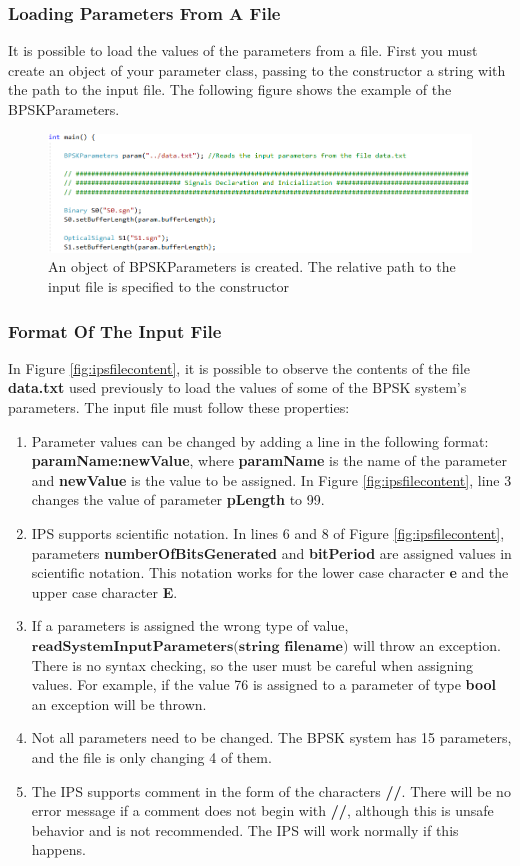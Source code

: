 \subsubsection{Loading Parameters From A File}
It is possible to load the values of the parameters from a file. First you must create an object of your parameter class, passing to the
constructor a string with the path to the input file. The following figure shows the example of the BPSKParameters.
\renewcommand{\figurename}{Figure}
\begin{figure}[H]
\centering
\includegraphics[width=0.8\linewidth]{./chapter/simulator_structure/figures/ips_reading_file}
\caption{An object of BPSKParameters is created. The relative path to the input file is specified to the constructor}
\label{fig:ipsfileparameters}
\end{figure}

\subsubsection{Format Of The Input File}
In Figure \ref{fig:ipsfilecontent}, it is possible to observe the contents of the file \textbf{data.txt} used previously to load the values
of some of the BPSK system's parameters. The input file must follow these properties:
\begin{enumerate}
\item Parameter values can be changed by adding a line in the following format: \textbf{paramName:newValue}, where \textbf{paramName} is the name of the parameter and \textbf{newValue} is the value to be assigned. In Figure \ref{fig:ipsfilecontent}, line 3 changes the value of parameter \textbf{pLength} to 99.
\item IPS supports scientific notation. In lines 6 and 8 of Figure \ref{fig:ipsfilecontent}, parameters \textbf{numberOfBitsGenerated} and \textbf{bitPeriod} are assigned values in scientific notation. This notation works for the lower case character \textbf{e} and the upper case character \textbf{E}.
\item If a parameters is assigned the wrong type of value, $\textbf{readSystemInputParameters(string filename)}$ will throw an exception. There is no syntax checking, so the user must be careful when assigning values. For example, if the value 76 is assigned to a parameter of type \textbf{bool} an exception will be thrown.
\item Not all parameters need to be changed. The BPSK system has 15 parameters, and the file is only changing 4 of them.
\item The IPS supports comment in the form of the characters \textbf{//}. There will be no error message if a comment does not begin with \textbf{//}, although this is unsafe behavior and is not recommended. The IPS will work normally if this happens.
\end{enumerate}

